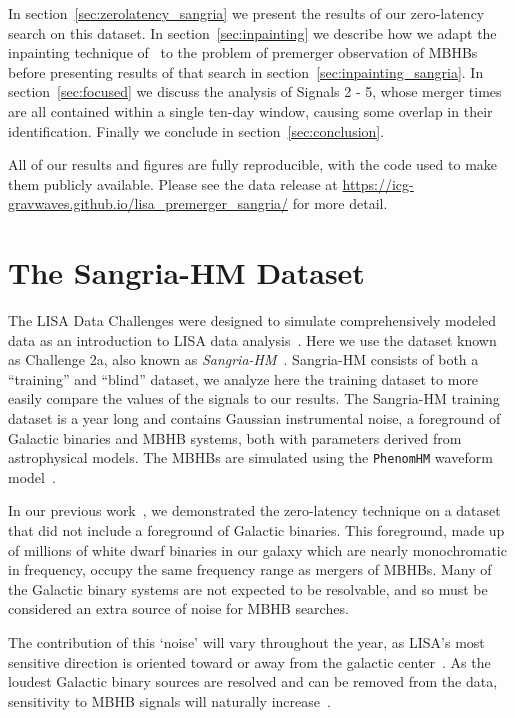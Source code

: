 \documentclass[%
 reprint,
superscriptaddress,
 nofootinbib,
 amsmath,amssymb,
 aps,
 prd,
]{revtex4-2}
\begin{document}
In section~\ref{sec:zerolatency_sangria} we present the results of our zero-latency search on this dataset.
In section~\ref{sec:inpainting} we describe how we adapt the inpainting technique of~\cite{Zackay:2019kkv} to the problem of premerger observation of \acp{MBHB} before presenting results of that search in section~\ref{sec:inpainting_sangria}.
In section~\ref{sec:focused} we discuss the analysis of Signals 2 - 5, whose merger times are all contained within a single ten-day window, causing some overlap in their identification.
Finally we conclude in section~\ref{sec:conclusion}.

All of our results and figures are fully reproducible, with the code
used to make them publicly available. Please see the data release at
\url{https://icg-gravwaves.github.io/lisa_premerger_sangria/}
for more detail.


\section{The Sangria-HM Dataset}
\label{sec:dataset}


The LISA Data Challenges were designed to simulate comprehensively modeled data as an introduction
to LISA data analysis~\cite{Baghi:2022ucj, LDC_WEBSITE}.
Here we use the dataset known as Challenge 2a, also known as
\textit{Sangria-HM}~\cite{LDC_WEBSITE_SANGRIA_HM}.
Sangria-HM  consists of both a ``training'' and ``blind'' dataset, we analyze here the training dataset to more easily compare the values of the signals to our results.
The Sangria-HM training dataset is a year long and contains Gaussian instrumental noise, a foreground of
Galactic binaries and \ac{MBHB} systems, both with parameters derived from astrophysical models.
The \acp{MBHB} are simulated using the \texttt{PhenomHM} waveform model~\cite{Garcia-Quiros:2020qpx}.

In our previous work~\cite{CabournDavies:2024hea}, we demonstrated the zero-latency technique
on a dataset that did not include a foreground of Galactic binaries.
This foreground, made up of millions of white dwarf binaries in our galaxy which are nearly monochromatic in frequency, occupy the same frequency range as mergers of \acp{MBHB}.
Many of the Galactic binary systems are not expected to be resolvable, and so must be considered an extra source of noise for \ac{MBHB} searches.

The contribution of this `noise' will vary throughout the year, as LISA's most sensitive direction is oriented toward or away from the galactic center~\cite{Colpi:2024xhw,Seto:2004ji}.
As the loudest Galactic binary sources are resolved and can be removed from the data, sensitivity to \ac{MBHB} signals will naturally increase~\cite{Crowder:2006eu,Strub:2024kbe}.
\end{document}
